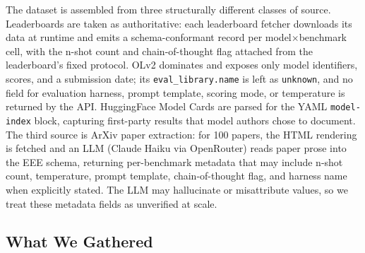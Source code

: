 \documentclass[11pt]{article}
\begin{document}
%
The dataset is assembled from three structurally different classes of
source. Leaderboards are taken as authoritative: each leaderboard fetcher
downloads its data at runtime and emits a schema-conformant record per
model$\times$benchmark cell, with the n-shot count and chain-of-thought
flag attached from the leaderboard's fixed protocol. OLv2 dominates and
exposes only model identifiers, scores, and a submission date; its
\texttt{eval\_library.name} is left as \texttt{unknown}, and no field for
evaluation harness, prompt template, scoring mode, or temperature is
returned by the API. HuggingFace Model Cards are parsed for the YAML
\texttt{model-index} block, capturing first-party results that model authors
chose to document. The third source is ArXiv paper extraction: for 100
papers, the HTML rendering is fetched and an LLM (Claude Haiku via
OpenRouter) reads paper prose into the EEE schema, returning per-benchmark
metadata that may include n-shot count, temperature, prompt template,
chain-of-thought flag, and harness name when explicitly stated. The LLM may
hallucinate or misattribute values, so we treat these metadata fields as
unverified at scale.


\subsection{What We Gathered}
\label{sec:dataset}
\end{document}

